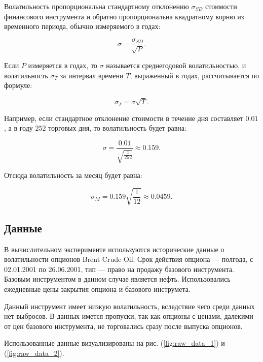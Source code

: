 \documentclass[12pt,a4paper]{amsart}
\begin{document}
Волатильность пропорциональна стандартному отклонению $\sigma_{SD}$ стоимости
финансового инструмента и обратно пропорциональна квадратному корню из
временного периода, обычно измеряемого в годах:

\[
\sigma = \frac{\sigma_{SD}}{\sqrt{P}}.
\]

Если $P$ измеряется в годах, то $\sigma$ называется среднегодовой
волатильностью, и волатильность $\sigma_T$ за интервал времени $T$,
выраженный в годах, рассчитывается по формуле:

\[
\sigma_T = \sigma \sqrt{T}.
\]

Например, если стандартное отклонение стоимости в течение дня составляет
$0.01$, а в году $252$ торговых дня, то волатильность будет равна:

\[
\sigma = \frac{0.01}{\sqrt{\frac{1}{252}}} \approx 0.159.
\]

Отсюда волатильность за месяц будет равна:

\[
\sigma_M = 0.159 \sqrt{\frac{1}{12}} \approx 0.0459.
\]

\subsection{Данные}

В вычислительном эксперименте используются исторические данные о
волатильности опционов Brent Crude Oil. Срок действия опциона --- полгода,
с 02.01.2001 по 26.06.2001, тип --- право на продажу базового инструмента.
Базовым инструментом в данном случае является нефть. Использовались
ежедневные цены закрытия опциона и базового инструмета.

Данный инструмент имеет низкую волатильность, вследствие чего среди данных
нет выбросов. В данных имется пропуски, так как опционы с ценами, далекими
от цен базового инструмента, не торговались сразу после выпуска опционов.

Использованные данные визуализированы на рис. (\ref{fig:raw_data_1}) и
(\ref{fig:raw_data_2}).
\end{document}
